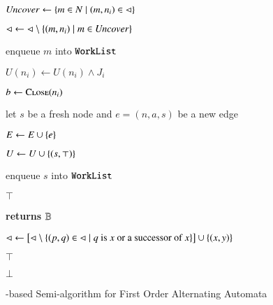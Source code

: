 \begin{algorithm}[t!]
{\begin{algorithmic}[1]
  \State $\mathit{Uncover} \leftarrow \{  m \in N \mid (m,n_i) \in \lhd  \}$
  
  \State $\lhd \leftarrow \lhd \setminus \{ (m,n_i) \mid m \in \mathit{Uncover} \}$


  \State enqueue $m$ into $\mathtt{WorkList}$
  
  \EndFor
  
  \State $U(n_i) \leftarrow U(n_i) \wedge J_i$


  \State $b \leftarrow \Call{Close}{n_i}$
  \label{ln:refine-end}

  \EndIf %

  \EndIf %

  \EndFor 

  \EndIf %


  \label{ln:expand-begin}

  \State let $s$ be a fresh node and $e = (n,a,s)$ be a new edge

  \State $E \leftarrow E \cup \{ e \}$
  \label{ln:edge-insert}

  \State $U \leftarrow U \cup \{ (s,\top) \}$

  \State enqueue $s$ into $\mathtt{WorkList}$
  \label{ln:expand-end}

  \EndFor

  \EndIf %

  \EndWhile  

   $\top$

   {\bf returns} $\mathbb{B}$

  
  
  \State $\lhd \leftarrow \left[\lhd \setminus \{  (p,q) \in \lhd \mid
      \text{$q$ is $x$ or a successor of $x$} \}\right] \cup \{ (x,y) \}$
  \label{ln:close-uncover}
  
   $\top$ 
  
  \EndIf
  
  \EndFor
  
   $\bot$

  \EndFunction

\end{algorithmic}}
\caption{\impact-based Semi-algorithm for First Order Alternating Automata}
\label{alg:impact}
\end{algorithm}
